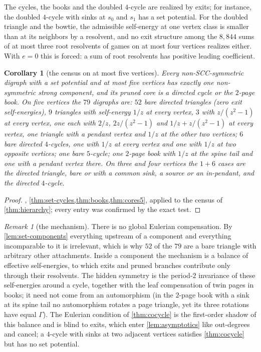\documentclass[11pt]{amsart}
\theoremstyle{plain}
\newtheorem{corollary}[theorem]{Corollary}
\theoremstyle{definition}
\theoremstyle{remark}
\newtheorem{remark}[theorem]{Remark}
\numberwithin{equation}{section}
\begin{document}
The cycles, the books and the doubled $4$-cycle are realized by exits; for instance, the doubled $4$-cycle with sinks at $s_0$ and $s_1$ has a set potential. For the doubled triangle and the bowtie, the admissible self-energy at one vertex class is smaller than at its neighbors by a resolvent, and no exit structure among the $8{,}844$ sums of at most three root resolvents of games on at most four vertices realizes either. With $e=0$ this is forced: a sum of root resolvents has positive leading coefficient.

\begin{corollary}[the census on at most five vertices]\label{cor:census5}
Every non-SCC-symmetric digraph with a set potential and at most five vertices has exactly one non-symmetric strong component, and its pruned core is a directed cycle or the $2$-page book. On five vertices the $79$ digraphs are: $52$ bare directed triangles (zero exit self-energies), $9$ triangles with self-energy $1/z$ at every vertex, $3$ with $z/(z^2-1)$ at every vertex, one each with $2/z$, $2z/(z^2-1)$ and $1/z+z/(z^2-1)$ at every vertex, one triangle with a pendant vertex and $1/z$ at the other two vertices; $6$ bare directed $4$-cycles, one with $1/z$ at every vertex and one with $1/z$ at two opposite vertices; one bare $5$-cycle; one $2$-page book with $1/z$ at the spine tail and one with a pendant vertex there. On three and four vertices the $1+6$ cases are the directed triangle, bare or with a common sink, a source or an in-pendant, and the directed $4$-cycle.
\end{corollary}
\begin{proof}
, \cref{thm:set-cycles,thm:books,thm:cores5}, applied to the census of \cref{thm:hierarchy}; every entry was confirmed by the exact test.
\end{proof}

\begin{remark}[the mechanism]\label{rem:mechanism}
There is no global Eulerian compensation. By \cref{lem:set-components} everything upstream of a component and everything incomparable to it is irrelevant, which is why $52$ of the $79$ are a bare triangle with arbitrary other attachments. Inside a component the mechanism is a balance of effective self-energies, to which exits and pruned branches contribute only through their resolvents. The hidden symmetry is the period-$2$ invariance of these self-energies around a cycle, together with the leaf compensation of twin pages in books; it need not come from an automorphism (in the $2$-page book with a sink at its spine tail no automorphism rotates a page triangle, yet its three rotations have equal $\Gamma$). The Eulerian condition of \cref{thm:cocycle} is the first-order shadow of this balance and is blind to exits, which enter \cref{lem:asymptotics} like out-degrees and cancel; a $4$-cycle with sinks at two adjacent vertices satisfies \cref{thm:cocycle} but has no set potential.
\end{remark}
\end{document}

